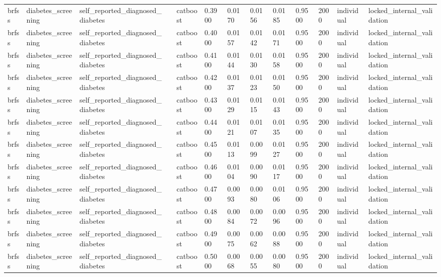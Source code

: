 \begin{tabular}{lllllllllllll}
brfss & diabetes\_screening & self\_reported\_diagnosed\_diabetes &  & catboost & 0.3900 & 0.0170 & 0.0156 & 0.0185 & 0.9500 & 2000 & individual & locked\_internal\_validation \\
brfss & diabetes\_screening & self\_reported\_diagnosed\_diabetes &  & catboost & 0.4000 & 0.0157 & 0.0142 & 0.0171 & 0.9500 & 2000 & individual & locked\_internal\_validation \\
brfss & diabetes\_screening & self\_reported\_diagnosed\_diabetes &  & catboost & 0.4100 & 0.0144 & 0.0130 & 0.0158 & 0.9500 & 2000 & individual & locked\_internal\_validation \\
brfss & diabetes\_screening & self\_reported\_diagnosed\_diabetes &  & catboost & 0.4200 & 0.0137 & 0.0123 & 0.0150 & 0.9500 & 2000 & individual & locked\_internal\_validation \\
brfss & diabetes\_screening & self\_reported\_diagnosed\_diabetes &  & catboost & 0.4300 & 0.0129 & 0.0115 & 0.0143 & 0.9500 & 2000 & individual & locked\_internal\_validation \\
brfss & diabetes\_screening & self\_reported\_diagnosed\_diabetes &  & catboost & 0.4400 & 0.0121 & 0.0107 & 0.0135 & 0.9500 & 2000 & individual & locked\_internal\_validation \\
brfss & diabetes\_screening & self\_reported\_diagnosed\_diabetes &  & catboost & 0.4500 & 0.0113 & 0.0099 & 0.0127 & 0.9500 & 2000 & individual & locked\_internal\_validation \\
brfss & diabetes\_screening & self\_reported\_diagnosed\_diabetes &  & catboost & 0.4600 & 0.0104 & 0.0090 & 0.0117 & 0.9500 & 2000 & individual & locked\_internal\_validation \\
brfss & diabetes\_screening & self\_reported\_diagnosed\_diabetes &  & catboost & 0.4700 & 0.0093 & 0.0080 & 0.0106 & 0.9500 & 2000 & individual & locked\_internal\_validation \\
brfss & diabetes\_screening & self\_reported\_diagnosed\_diabetes &  & catboost & 0.4800 & 0.0084 & 0.0072 & 0.0096 & 0.9500 & 2000 & individual & locked\_internal\_validation \\
brfss & diabetes\_screening & self\_reported\_diagnosed\_diabetes &  & catboost & 0.4900 & 0.0075 & 0.0062 & 0.0088 & 0.9500 & 2000 & individual & locked\_internal\_validation \\
brfss & diabetes\_screening & self\_reported\_diagnosed\_diabetes &  & catboost & 0.5000 & 0.0068 & 0.0055 & 0.0080 & 0.9500 & 2000 & individual & locked\_internal\_validation \\

\end{tabular}
